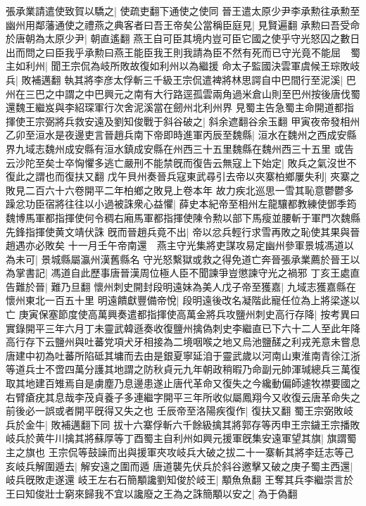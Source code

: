 張承業請遣使致賀以驕之|{
	使疏吏翻下通使之使同}
晉王遣太原少尹李承勲往承勲至幽州用鄰藩通使之禮燕之典客者曰吾王帝矣公當稱臣庭見|{
	見賢遍翻}
承勲曰吾受命於唐朝為太原少尹|{
	朝直遙翻}
燕王自可臣其境内豈可臣它國之使乎守光怒囚之數日出而問之曰臣我乎承勲曰燕王能臣我王則我請為臣不然有死而已守光竟不能屈　蜀主如利州|{
	聞王宗侃為岐所敗故復如利州以為繼援}
命太子監國決雲軍虞候王琮敗岐兵|{
	敗補邁翻}
執其將李彦太俘斬三千級王宗侃遣裨將林思諤自中巴間行至泥溪|{
	巴州在三巴之中謂之中巴興元之南有大行路逕孤雲兩角過米倉山則至巴州按後唐伐蜀還魏王繼岌與李紹琛軍行次舍泥溪當在劒州北利州界}
見蜀主告急蜀主命開道都指揮使王宗弼將兵救安遠及劉知俊戰于斜谷破之|{
	斜余遮翻谷余玉翻}
甲寅夜帝發相州乙卯至洹水是夜邊吏言晉趙兵南下帝即時進軍丙辰至魏縣|{
	洹水在魏州之西成安縣界九域志魏州成安縣有洹水鎮成安縣在州西三十五里魏縣在魏州西三十五里}
或告云沙陀至矣士卒恟懼多逃亡嚴刑不能禁旣而復告云無寇上下始定|{
	敗兵之氣沒世不復此之謂也而復扶又翻}
戊午貝州奏晉兵寇東武尋引去帝以夾寨柏鄉屢失利|{
	夾寨之敗見二百六十六卷開平二年柏鄉之敗見上卷本年}
故力疾北巡思一雪其恥意鬱鬱多躁忿功臣宿將往往以小過被誅衆心益懼|{
	薛史本紀帝至相州左龍驤都教練使鄧季筠魏博馬軍都指揮使何令稠右廂馬軍都指揮使陳令勲以部下馬瘦並腰斬于軍門次魏縣先鋒指揮使黄文靖伏誅}
旣而晉趙兵竟不出|{
	帝以忿兵輕行求雪再敗之恥使其果與晉趙遇亦必敗矣}
十一月壬午帝南還　燕主守光集將吏謀攻易定幽州參軍景城馮道以為未可|{
	景城縣屬瀛州漢舊縣名}
守光怒繫獄或救之得免道亡奔晉張承業薦於晉王以為掌書記|{
	馮道自此歷事唐晉漢周位極人臣不聞諫爭豈懲諫守光之禍邪}
丁亥王處直告難於晉|{
	難乃旦翻}
懷州刺史開封段明遠妹為美人戊子帝至獲嘉|{
	九域志獲嘉縣在懷州東北一百五十里}
明遠饋獻豐備帝悅|{
	段明遠後改名凝階此寵任位為上將梁遂以亡}
庚寅保塞節度使高萬興奏遣都指揮使高萬金將兵攻鹽州刺史高行存降|{
	按考異曰實錄開平三年六月丁未靈武韓遜奏收復鹽州擒偽刺史李繼直已下六十二人至此年降高行存下云鹽州與吐蕃党項犬牙相接為二境咽喉之地又烏池鹽醝之利戎羌意未嘗息唐建中初為吐蕃所陷砥其墉而去由是銀夏寧延洎于靈武歲以河南山東淮南青徐江浙等道兵士不啻四萬分護其地謂之防秋貞元九年朝政稍暇乃命副元帥渾瑊總兵三萬復取其地建百雉焉自是虜塵乃息邊患遂止唐代革命又復失之今纔動偏師遽牧襟要國之右臂瘡疣其息哉李茂貞養子多連繼字開平三年所收似屬鳳翔今又收復云唐革命失之前後必一誤或者開平旣得又失之也}
壬辰帝至洛陽疾復作|{
	復扶又翻}
蜀王宗弼敗岐兵於金牛|{
	敗補邁翻下同}
拔十六寨俘斬六千餘級擒其將郭存等丙申王宗鐬王宗播敗岐兵於黄牛川擒其將蘇厚等丁酉蜀主自利州如興元援軍旣集安遠軍望其旗|{
	旗謂蜀主之旗也}
王宗侃等鼓譟而出與援軍夾攻岐兵大破之拔二十一寨斬其將李廷志等己亥岐兵解圍遁去|{
	解安遠之圍而遁}
唐道襲先伏兵於斜谷邀擊又破之庚子蜀主西還|{
	岐兵旣敗走遂還}
岐王左右石簡顒讒劉知俊於岐王|{
	顒魚魚翻}
王奪其兵李繼崇言於王曰知俊壯士窮來歸我不宜以讒廢之王為之誅簡顒以安之|{
	為于偽翻}
